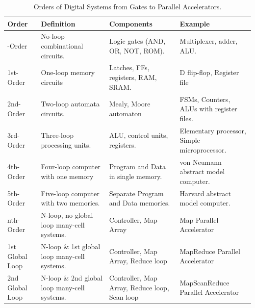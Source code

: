 \documentclass[11pt]{book}
\begin{document}
\begin{table}[h!]
\centering
\renewcommand{\arraystretch}{1.2} %
\begin{tabular}{|>{\centering\arraybackslash}m{1.8cm} | >{\centering\arraybackslash}m{4.2cm} | >{\centering\arraybackslash}m{3.7cm} | >{\centering\arraybackslash}m{3.8cm}|}
\hline
\textbf{Order} & \textbf{Definition} & \textbf{Components} & \textbf{Example} \\ \hline

0-Order & No-loop combinational circuits. & Logic gates (AND, OR, NOT, ROM). & Multiplexer, adder, ALU. \\ \hline

1st-Order & One-loop memory circuits & Latches, FFs, registers, RAM, SRAM. & D flip-flop, Register file \\ \hline

2nd-Order & Two-loop automata circuits. & Mealy, Moore automaton & FSMs, Counters,  ALUs with register files. \\ \hline

3rd-Order & Three-loop processing units. & ALU, control units, registers. & Elementary processor, Simple microprocessor. \\ \hline

4th-Order & Four-loop computer with one memory & Program and Data in single memory. & von Neumann abstract model computer. \\ \hline

5th-Order & Five-loop computer with two memories. & Separate Program and Data memories. & Harvard abstract model computer. \\ \hline

nth-Order  & N-loop, no global loop many-cell systems. & Controller, Map Array & Map Parallel Accelerator  \\ \hline

1st  Global Loop & N-loop \&  1st global loop many-cell systems. & Controller, Map Array, Reduce loop & MapReduce Parallel Accelerator  \\ \hline

2nd  Global Loop & N-loop \& 2nd global loop many-cell systems. & Controller, Map Array, Reduce loop, Scan loop & MapScanReduce Parallel Accelerator \\ \hline

\end{tabular}
\caption{Orders of Digital Systems from Gates to Parallel Accelerators.}
\label{tab:orders_of_computing_systems}
\end{table}
\end{document}
